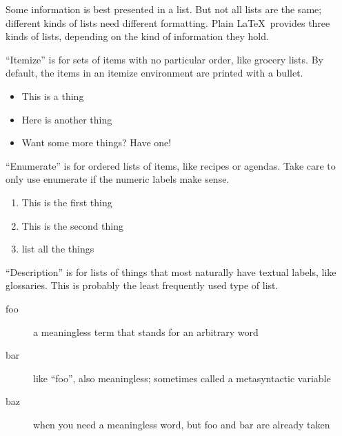 \documentclass{article}
\begin{document}
Some information is best presented in a list. But not all lists are the same; different kinds of lists need different formatting. Plain \LaTeX\ provides three kinds of lists, depending on the kind of information they hold.

``Itemize'' is for sets of items with no particular order, like grocery lists. By default, the items in an itemize environment are printed with a bullet.
\begin{itemize}
\item This is a thing
\item Here is another thing
\item Want some more things? Have one!
\end{itemize}

``Enumerate'' is for ordered lists of items, like recipes or agendas. Take care to only use enumerate if the numeric labels make sense.
\begin{enumerate}
\item This is the first thing
\item This is the second thing
\item list all the things
\end{enumerate}

``Description'' is for lists of things that most naturally have textual labels, like glossaries. This is probably the least frequently used type of list.
\begin{description}
\item[foo] a meaningless term that stands for an arbitrary word
\item[bar] like ``foo'', also meaningless; sometimes called a metasyntactic variable
\item[baz] when you need a meaningless word, but foo and bar are already taken
\end{description}
\end{document}
